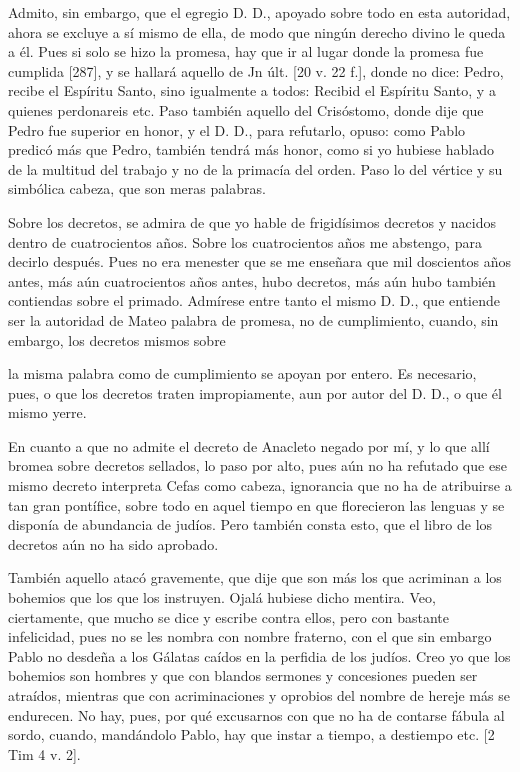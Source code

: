 Admito, sin embargo, que el egregio D. D., apoyado sobre todo en esta autoridad, ahora se excluye a sí mismo de ella, de modo que ningún derecho divino le queda a él. Pues si solo se hizo la promesa, hay que ir al lugar donde la promesa fue cumplida [287], y se hallará aquello de Jn últ. [20 v. 22 f.], donde no dice: Pedro, recibe el Espíritu Santo, sino igualmente a todos: Recibid el Espíritu Santo, y a quienes perdonareis etc. Paso también aquello del Crisóstomo, donde dije que Pedro fue superior en honor, y el D. D., para refutarlo, opuso: como Pablo predicó más que Pedro, también tendrá más honor, como si yo hubiese hablado de la multitud del trabajo y no de la primacía del orden. Paso lo del vértice y su simbólica cabeza, que son meras palabras.

Sobre los decretos, se admira de que yo hable de frigidísimos decretos y nacidos dentro de cuatrocientos años. Sobre los cuatrocientos años me abstengo, para decirlo después. Pues no era menester que se me enseñara que mil doscientos años antes, más aún cuatrocientos años antes, hubo decretos, más aún hubo también contiendas sobre el primado. Admírese entre tanto el mismo D. D., que entiende ser la autoridad de Mateo palabra de promesa, no de cumplimiento, cuando, sin embargo, los decretos mismos sobre

la misma palabra como de cumplimiento se apoyan por entero. Es necesario, pues, o que los decretos traten impropiamente, aun por autor del D. D., o que él mismo yerre.

En cuanto a que no admite el decreto de Anacleto negado por mí, y lo que allí bromea sobre decretos sellados, lo paso por alto, pues aún no ha refutado que ese mismo decreto interpreta Cefas como cabeza, ignorancia que no ha de atribuirse a tan gran pontífice, sobre todo en aquel tiempo en que florecieron las lenguas y se disponía de abundancia de judíos. Pero también consta esto, que el libro de los decretos aún no ha sido aprobado.

También aquello atacó gravemente, que dije que son más los que acriminan a los bohemios que los que los instruyen. Ojalá hubiese dicho mentira. Veo, ciertamente, que mucho se dice y escribe contra ellos, pero con bastante infelicidad, pues no se les nombra con nombre fraterno, con el que sin embargo Pablo no desdeña a los Gálatas caídos en la perfidia de los judíos. Creo yo que los bohemios son hombres y que con blandos sermones y concesiones pueden ser atraídos, mientras que con acriminaciones y oprobios del nombre de hereje más se endurecen. No hay, pues, por qué excusarnos con que no ha de contarse fábula al sordo, cuando, mandándolo Pablo, hay que instar a tiempo, a destiempo etc. [2 Tim 4 v. 2].

